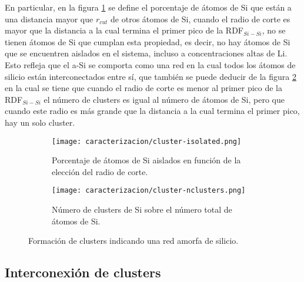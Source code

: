 En particular, en la figura \ref{fig:clusters-isolated} se define el porcentaje 
de átomos de Si que están a una distancia mayor que $r_{cut}$ de otros átomos de 
Si, cuando el radio de corte es mayor que la distancia a la cual termina el 
primer pico de la RDF$_{Si-Si}$, no se tienen átomos de Si que cumplan esta 
propiedad, es decir, no hay átomos de Si que se encuentren aislados en el sistema, 
incluso a concentraciones altas de Li. Esto refleja que el a-Si se comporta como 
una red en la cual todos los átomos de silicio están interconectados entre sí, 
que también se puede deducir de la figura \ref{fig:clusters-nclusters} en la cual 
se tiene que cuando el radio de corte es menor al primer pico de la RDF$_{Si-Si}$ 
el número de clusters es igual al número de átomos de Si, pero que cuando este 
radio es más grande que la distancia a la cual termina el primer pico, hay un 
solo cluster.

\begin{figure}[h]
    \centering
    \begin{subfigure}{.475\textwidth}
        \centering
        \texttt{[image: caracterizacion/cluster-isolated.png]}
        \caption{Porcentaje de átomos de Si aislados en función de la elección del
        radio de corte.}
        \label{fig:clusters-isolated}
    \end{subfigure}
    \hfill
    \begin{subfigure}{.475\textwidth}
        \centering
        \texttt{[image: caracterizacion/cluster-nclusters.png]}
        \caption{Número de clusters de Si sobre el número total de átomos de Si.}
        \label{fig:clusters-nclusters}
    \end{subfigure}
    \caption{Formación de clusters indicando una red amorfa de silicio.}
    \label{fig:clusters}
\end{figure}

\subsection{Interconexión de clusters}\label{s:intercionexion}

